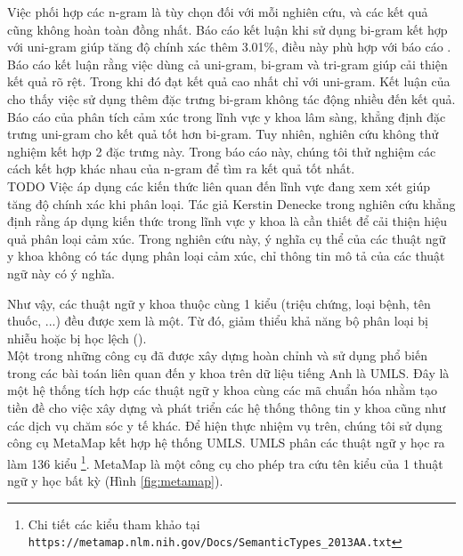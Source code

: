 Việc phối hợp các n-gram là tùy chọn đối với mỗi nghiên cứu, và các kết quả cũng không hoàn toàn đồng nhất. Báo cáo \cite{niu2005analysis} kết luận khi sử dụng bi-gram kết hợp với uni-gram giúp tăng độ chính xác thêm 3.01\%, điều này phù hợp với báo cáo \cite{sarker2011outcome}. Báo cáo \cite{sarker2011outcome} kết luận rằng việc dùng cả uni-gram, bi-gram và tri-gram giúp cải thiện kết quả rõ rệt. Trong khi đó \cite{pang2002thumbs} đạt kết quả cao nhất chỉ với uni-gram. Kết luận của \cite{pang2002thumbs} cho thấy việc sử dụng thêm đặc trưng bi-gram không tác động nhiều đến kết quả. Báo cáo của \cite{smith2012cross} phân tích cảm xúc trong lĩnh vực y khoa lâm sàng, khẳng định đặc trưng uni-gram cho kết quả tốt hơn bi-gram. Tuy nhiên, nghiên cứu không thử nghiệm kết hợp 2 đặc trưng này. Trong báo cáo này, chúng tôi thử nghiệm các cách kết hợp khác nhau của n-gram để tìm ra kết quả tốt nhất.\\

TODO Việc áp dụng các kiến thức liên quan đến lĩnh vực đang xem xét giúp tăng độ chính xác khi phân loại. Tác giả Kerstin Denecke trong nghiên cứu \cite{denecke2015sentiment} khẳng định rằng áp dụng kiến thức trong lĩnh vực y khoa là cần thiết để cải thiện hiệu quả phân loại cảm xúc. Trong nghiên cứu này, ý nghĩa cụ thể của các thuật ngữ y khoa không có tác dụng phân loại cảm xúc, chỉ thông tin mô tả của các thuật ngữ này có ý nghĩa.\\


Như vậy, các thuật ngữ y khoa thuộc cùng 1 kiểu (triệu chứng, loại bệnh, tên thuốc, ...) đều được xem là một. Từ đó, giảm thiểu khả năng bộ phân loại bị nhiễu hoặc bị học lệch ().\\

Một trong những công cụ đã được xây dựng hoàn chỉnh và sử dụng phổ biến trong các bài toán liên quan đến y khoa trên dữ liệu tiếng Anh là UMLS. Đây là một hệ thống tích hợp các thuật ngữ y khoa cùng các mã chuẩn hóa nhằm tạo tiền đề cho việc xây dựng và phát triển các hệ thống thông tin y khoa cũng như các dịch vụ chăm sóc y tế khác. Để hiện thực nhiệm vụ trên, chúng tôi sử dụng công cụ MetaMap kết hợp hệ thống UMLS. UMLS phân các thuật ngữ y học ra làm 136 kiểu \footnote{Chi tiết các kiểu tham khảo tại \texttt{https://metamap.nlm.nih.gov/Docs/SemanticTypes\_2013AA.txt}}. MetaMap là một công cụ cho phép tra cứu tên kiểu của 1 thuật ngữ y học bất kỳ (Hình \ref{fig:metamap}).\\

